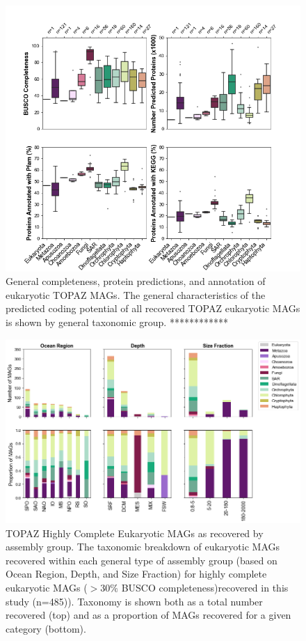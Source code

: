 \documentclass[12pt]{article}
\numberwithin{equation}{section}
\begin{document}
\begin{landscape}
\begin{figure}
    \centering
    \includegraphics[width=0.8\columnwidth]{si-figures/HQ_MAG_protein_bar_plots.png}
    \caption{General completeness, protein predictions, and annotation of eukaryotic TOPAZ MAGs. The general characteristics of the predicted coding potential of all recovered TOPAZ eukaryotic MAGs is shown by general taxonomic group. ************}
    \label{fig:hq-prot-bar}
\end{figure}
\end{landscape}

\begin{landscape}
\begin{figure}
    \centering
    \includegraphics[width=0.95\columnwidth]{si-figures/HQ_MAG_distributions.png}
    \caption{TOPAZ Highly Complete Eukaryotic MAGs as recovered by assembly group. The taxonomic breakdown of eukaryotic MAGs recovered within each general type of assembly group (based on Ocean Region, Depth, and Size Fraction) for highly complete eukaryotic MAGs ($>30\%$ BUSCO completeness)recovered in this study (n=485)). Taxonomy is shown both as a total number recovered (top) and as a proportion of MAGs recovered for a given category (bottom). }
    \label{fig:hq-dist}
\end{figure}
\end{landscape}
\end{document}
